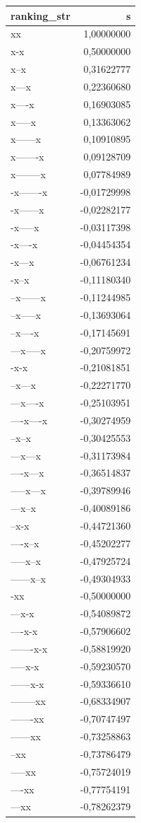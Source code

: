 \documentclass[
  letterpaper,
  DIV=11,
  numbers=noendperiod]{scrreprt}
\begin{document}
\begin{longtable*}{lr}
\toprule
ranking\_str & s \\ 
\midrule\addlinespace[2.5pt]
xx & 1,00000000 \\ 
x-x & 0,50000000 \\ 
x--x & 0,31622777 \\ 
x---x & 0,22360680 \\ 
x----x & 0,16903085 \\ 
x-----x & 0,13363062 \\ 
x------x & 0,10910895 \\ 
x-------x & 0,09128709 \\ 
x--------x & 0,07784989 \\ 
-x-------x & -0,01729998 \\ 
-x------x & -0,02282177 \\ 
-x-----x & -0,03117398 \\ 
-x----x & -0,04454354 \\ 
-x---x & -0,06761234 \\ 
-x--x & -0,11180340 \\ 
--x------x & -0,11244985 \\ 
--x-----x & -0,13693064 \\ 
--x----x & -0,17145691 \\ 
---x-----x & -0,20759972 \\ 
-x-x & -0,21081851 \\ 
--x---x & -0,22271770 \\ 
---x----x & -0,25103951 \\ 
----x----x & -0,30274959 \\ 
--x--x & -0,30425553 \\ 
---x---x & -0,31173984 \\ 
----x---x & -0,36514837 \\ 
-----x---x & -0,39789946 \\ 
---x--x & -0,40089186 \\ 
--x-x & -0,44721360 \\ 
----x--x & -0,45202277 \\ 
-----x--x & -0,47925724 \\ 
------x--x & -0,49304933 \\ 
-xx & -0,50000000 \\ 
---x-x & -0,54089872 \\ 
----x-x & -0,57906602 \\ 
-------x-x & -0,58819920 \\ 
-----x-x & -0,59230570 \\ 
------x-x & -0,59336610 \\ 
--------xx & -0,68334907 \\ 
-------xx & -0,70747497 \\ 
------xx & -0,73258863 \\ 
--xx & -0,73786479 \\ 
-----xx & -0,75724019 \\ 
----xx & -0,77754191 \\ 
---xx & -0,78262379 \\ 
\bottomrule
\end{longtable*}
\end{document}
